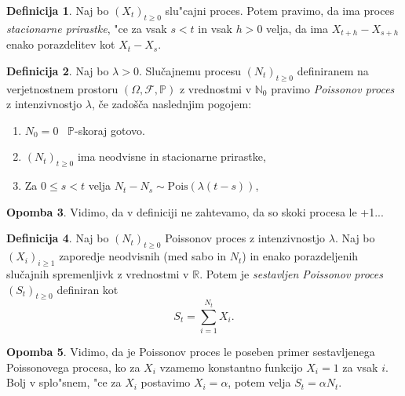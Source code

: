 \documentclass[12pt,a4paper]{amsart}
\theoremstyle{definition} %
\newtheorem{definicija}{Definicija}[section]
\newtheorem{opomba}[definicija]{Opomba}
\theoremstyle{plain} %
\newcommand{\N}{\mathbb{N}}
\newcommand{\Prob}{\mathbb{P}}
\newcommand{\1}{\mathds{1}}
\newcommand{\Pois}[1]{\text{Pois}(#1)}
\begin{document}
    \begin{definicija}
        Naj bo $(X_t)_{t\geq0}$ slu"cajni proces. Potem pravimo, da ima proces
        \textit{stacionarne prirastke}, "ce za vsak $s < t$ in vsak $h > 0$ velja, 
        da ima $X_{t+h} - X_{s+h}$ enako porazdelitev kot $X_t - X_s$.
        \label{def:stacPrir}
    \end{definicija}

    \begin{definicija}
        Naj bo $\lambda > 0$. Slučajnemu procesu $(N_t)_{t\geq 0}$ definiranem na verjetnostnem 
        prostoru $(\Omega, \mathcal{F}, \mathbb{P})$ z vrednostmi v $\N_0$ pravimo 
        \textit{Poissonov proces} z intenzivnostjo $\lambda$, če zadošča naslednjim pogojem:
        \begin{enumerate}
            \item $N_0 = 0$ \ $\Prob$-skoraj gotovo.
            \item $(N_t)_{t\geq 0}$ ima neodvisne in stacionarne prirastke,
            \item Za $0 \leq s < t$ velja $ N_t - N_s \sim\Pois{\lambda(t - s)}$,
        \end{enumerate}
        \label{def:HPP}
    \end{definicija}

    \begin{opomba}
        Vidimo, da v definiciji ne zahtevamo, da so skoki procesa le +1... 
        \label{op:skoki}
    \end{opomba}

    \begin{definicija}
        Naj bo $(N_t)_{t\geq0}$ Poissonov proces z intenzivnostjo $\lambda$. 
        Naj bo $(X_i)_{i\geq1}$ zaporedje neodvisnih (med sabo in $N_t$) in enako porazdeljenih slučajnih spremenljivk 
        z vrednostmi v $\mathbb{R}$. Potem je \textit{sestavljen Poissonov proces} 
        $(S_t)_{t\geq0}$ definiran kot
        $$
            S_t = \sum_{i=1}^{N_t} X_i.
        $$
        \label{def:CPP}
    \end{definicija}

    \begin{opomba}
        Vidimo, da je Poissonov proces le poseben primer sestavljenega Poissonovega procesa, ko za
        $X_i$ vzamemo konstantno funkcijo $X_i = 1$ za vsak $i$. Bolj v splo"snem, "ce za $X_i$ 
        postavimo $X_i = \alpha$, potem velja $S_t = \alpha N_t$.
        \label{op:CPPHPPPovezava}
    \end{opomba}
\end{document}
